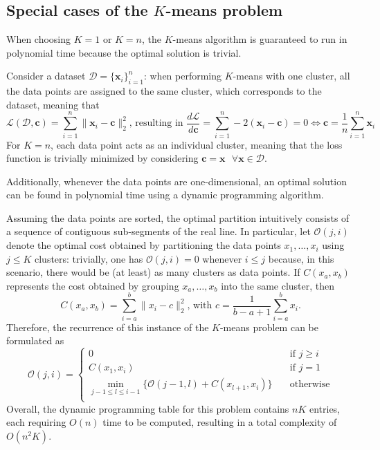 \documentclass{report}
\begin{document}
\subsection{Special cases of the $K$-means problem}
When choosing $\displaystyle K = 1$ or $\displaystyle K = n$, the $\displaystyle K$-means algorithm is guaranteed to run in polynomial time because the optimal solution is trivial.
\begin{proofbox}
    Consider a dataset $\displaystyle \mathcal{D} = \{\mathbf{x}_i\}_{i = 1}^n$: when performing $\displaystyle K$-means with one cluster, all the data points are assigned to the same cluster, which corresponds to the dataset, meaning that
    \[\mathcal{L}(\mathcal{D}, \mathbf{c}) = \sum_{i = 1}^n \lVert \mathbf{x}_i - \mathbf{c} \rVert_2^2 \text{, resulting in } \frac{d\mathcal{L}}{d\mathbf{c}} = \sum_{i = 1}^n -2(\mathbf{x}_i - \mathbf{c}) = 0 \Leftrightarrow \mathbf{c} = \frac{1}{n}\sum_{i = 1}^n \mathbf{x}_i\]
    For $\displaystyle K = n$, each data point acts as an individual cluster, meaning that the loss function is trivially minimized by considering $\displaystyle \mathbf{c} = \mathbf{x} \text{ } \forall \mathbf{x} \in \mathcal{D}$.
\end{proofbox}
\noindent Additionally, whenever the data points are one-dimensional, an optimal solution can be found in polynomial time using a dynamic programming algorithm.
\begin{proofbox}
    Assuming the data points are sorted, the optimal partition intuitively consists of a sequence of contiguous sub-segments of the real line. \newline
    In particular, let $\displaystyle \mathcal{O}(j, i)$ denote the optimal cost obtained by partitioning the data points $\displaystyle x_1, \dots, x_i$ using $\displaystyle j \leq K$ clusters: trivially, one has $\displaystyle \mathcal{O}(j, i) = 0$ whenever $\displaystyle i \leq j$ because, in this scenario, there would be (at least) as many clusters as data points. \newline
    If $\displaystyle C(x_a, x_b)$ represents the cost obtained by grouping $\displaystyle x_a, \dots, x_b$ into the same cluster, then
    \[C(x_a, x_b) = \sum_{i = a}^b \lVert x_i - c \rVert_2^2 \text{, with $c = \frac{1}{b - a + 1}\sum_{i = a}^b x_i$.}\]
    Therefore, the recurrence of this instance of the $\displaystyle K$-means problem can be formulated as
    \[\mathcal{O}(j, i) = \begin{cases}
        0 &\quad\text{if $j \ge i$} \\
        C(x_1, x_i) &\quad\text{if $j = 1$} \\
        \min_{j - 1 \leq l \leq i - 1}\{\mathcal{O}(j - 1, l) + C(x_{l + 1}, x_i)\} &\quad\text{otherwise} \\
    \end{cases}\]
    Overall, the dynamic programming table for this problem contains $\displaystyle nK$ entries, each requiring $\displaystyle O(n)$ time to be computed, resulting in a total complexity of $\displaystyle O(n^2K)$.
\end{proofbox}
\end{document}
